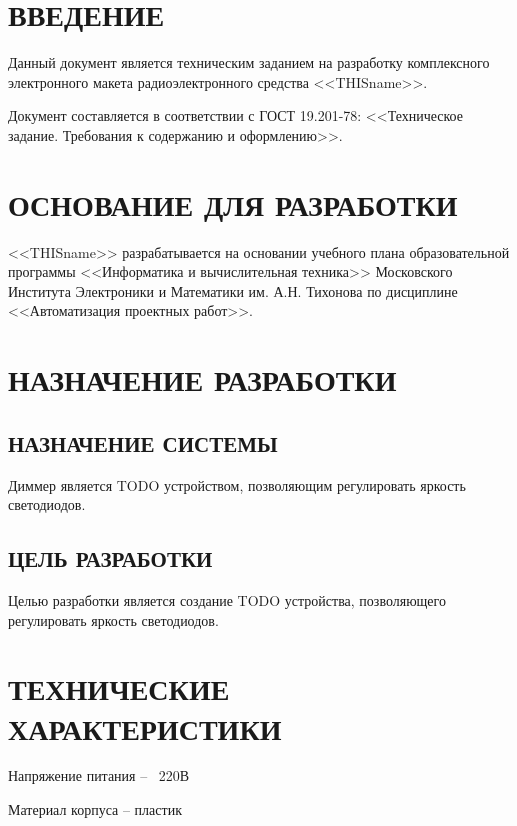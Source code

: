 \documentclass[a4paper,14pt]{article}
\begin{document}

\tableofcontents
\pagebreak

\section*{ВВЕДЕНИЕ}

Данный документ является техническим заданием на разработку комплексного электронного макета радиоэлектронного средства <<THISname>>.

Документ составляется в соответствии с ГОСТ 19.201-78: <<Техническое задание. Требования к содержанию и оформлению>>.
\newpage 

\section{ОСНОВАНИЕ ДЛЯ РАЗРАБОТКИ}

<<THISname>> разрабатывается на основании учебного плана образовательной программы <<Информатика и вычислительная техника>> Московского Института Электроники и Математики им. А.Н. Тихонова по дисциплине <<Автоматизация проектных работ>>. 
\newpage 

\section{НАЗНАЧЕНИЕ РАЗРАБОТКИ}
\subsection{НАЗНАЧЕНИЕ СИСТЕМЫ}

Диммер является TODO устройством, позволяющим регулировать яркость светодиодов.	

\newpage

\subsection{ЦЕЛЬ РАЗРАБОТКИ}

Целью разработки является создание TODO устройства, позволяющего регулировать яркость светодиодов.	

\newpage

\section{ТЕХНИЧЕСКИЕ ХАРАКТЕРИСТИКИ}

Напряжение питания -- ~220В

Материал корпуса -- пластик
\end{document}
